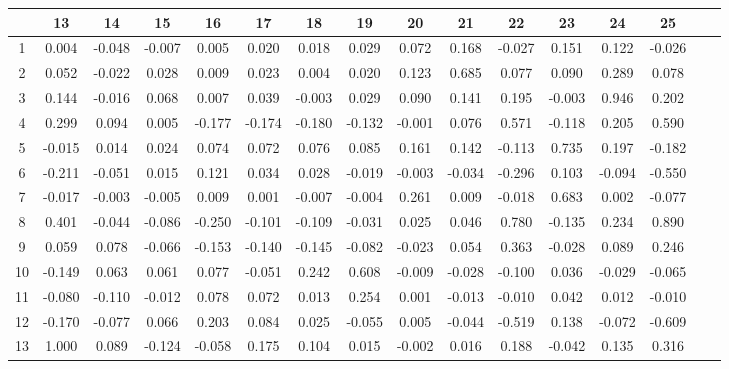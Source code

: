 \documentclass[ %
                    author={Sam Phippen},
                supervisor={Dr. Rafal Bogacz},
                     title={Real time voice activity detectors in noisy personal computing environments},
                  subtitle={},
                    degree={MEng},
                      year={2012} ]{thesis}
\begin{document}
\begin{table}

    \begin{tabular}{|c|c|c|c|c|c|c|c|c|c|c|c|c|c|c|c|}
        \hline
           & 13     & 14     & 15     & 16     & 17     & 18     & 19     & 20     & 21     & 22     & 23     & 24     & 25 \\ \hline
        1  & 0.004  & -0.048 & -0.007 & 0.005  & 0.020  & 0.018  & 0.029  & 0.072  & 0.168  & -0.027 & 0.151  & 0.122  & -0.026 \\ \hline
        2  & 0.052  & -0.022 & 0.028  & 0.009  & 0.023  & 0.004  & 0.020  & 0.123  & 0.685  & 0.077  & 0.090  & 0.289  & 0.078 \\ \hline
        3  & 0.144  & -0.016 & 0.068  & 0.007  & 0.039  & -0.003 & 0.029  & 0.090  & 0.141  & 0.195  & -0.003 & 0.946  & 0.202 \\ \hline
        4  & 0.299  & 0.094  & 0.005  & -0.177 & -0.174 & -0.180 & -0.132 & -0.001 & 0.076  & 0.571  & -0.118 & 0.205  & 0.590 \\ \hline
        5  & -0.015 & 0.014  & 0.024  & 0.074  & 0.072  & 0.076  & 0.085  & 0.161  & 0.142  & -0.113 & 0.735  & 0.197  & -0.182 \\ \hline
        6  & -0.211 & -0.051 & 0.015  & 0.121  & 0.034  & 0.028  & -0.019 & -0.003 & -0.034 & -0.296 & 0.103  & -0.094 & -0.550 \\ \hline
        7  & -0.017 & -0.003 & -0.005 & 0.009  & 0.001  & -0.007 & -0.004 & 0.261  & 0.009  & -0.018 & 0.683  & 0.002  & -0.077 \\ \hline
        8  & 0.401  & -0.044 & -0.086 & -0.250 & -0.101 & -0.109 & -0.031 & 0.025  & 0.046  & 0.780  & -0.135 & 0.234  & 0.890 \\ \hline
        9  & 0.059  & 0.078  & -0.066 & -0.153 & -0.140 & -0.145 & -0.082 & -0.023 & 0.054  & 0.363  & -0.028 & 0.089  & 0.246 \\ \hline
        10 & -0.149 & 0.063  & 0.061  & 0.077  & -0.051 & 0.242  & 0.608  & -0.009 & -0.028 & -0.100 & 0.036  & -0.029 & -0.065 \\ \hline
        11 & -0.080 & -0.110 & -0.012 & 0.078  & 0.072  & 0.013  & 0.254  & 0.001  & -0.013 & -0.010 & 0.042  & 0.012  & -0.010 \\ \hline
        12 & -0.170 & -0.077 & 0.066  & 0.203  & 0.084  & 0.025  & -0.055 & 0.005  & -0.044 & -0.519 & 0.138  & -0.072 & -0.609 \\ \hline
        13 & 1.000  & 0.089  & -0.124 & -0.058 & 0.175  & 0.104  & 0.015  & -0.002 & 0.016  & 0.188  & -0.042 & 0.135  & 0.316 \\ \hline

\end{tabular}
\end{table}
\end{document}
